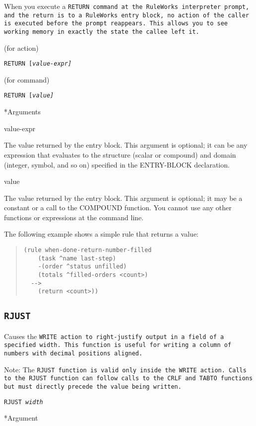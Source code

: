 {{When you execute a \tt{RETURN} command at the RuleWorks interpreter
prompt, and the return is to a RuleWorks entry block, no action of the
caller is executed before the prompt reappears. This allows you to see
working memory in exactly the state the callee left it.

\Format (for action)

\tt{RETURN} [\it{value-expr}]

(for command)

\tt{RETURN} [\it{value}]

*Arguments

value-expr

The value returned by the entry block. This argument is
optional; it can be any expression that evaluates to the
structure (scalar or compound) and domain (integer, symbol,
and so on) specified in the ENTRY-BLOCK declaration.

value

The value returned by the entry block. This argument is
optional; it may be a constant or a call to the COMPOUND
function. You cannot use any other functions or expressions
at the command line.

\Example

The following example shows a simple rule that returns a
value:

\begin{quote}
\begin{verbatim}
(rule when-done-return-number-filled
    (task ^name last-step)
    -(order ^status unfilled)
    (totals ^filled-orders <count>)
  -->
    (return <count>))
\end{verbatim}
\end{quote}

\subsection{\tt{RJUST}}

Causes the \tt{WRITE} action to right-justify output in a field of
a specified width. This function is useful for writing a
column of numbers with decimal positions aligned.

Note: The \tt{RJUST} function is valid only inside the \tt{WRITE}
action. Calls to the \tt{RJUST} function can follow calls to the
\tt{CRLF} and \tt{TABTO} functions but must directly precede the value
being written.

\Format

\tt{RJUST} \it{width}

*Argument

}}
